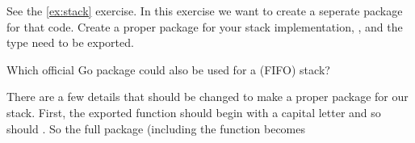 \begin{Exercise}[title={Stack as package},difficulty=2]
\label{ex:stack-package}
See the \ref{ex:stack} exercise. In this exercise we want to create
a seperate package for that code.
\Question\label{ex:stack-package q1} Create a proper package for your
stack implementation, ,  and the  type need to be
exported.

\Question\label{ex:stack-package q2} Which official Go package could
also be used for a (FIFO) stack?

\end{Exercise}

\begin{Answer}
\Question There are a few details that should be changed to make a proper package
for our stack. First, the exported function should begin with a capital 
letter and so should . So the full package (including the
 function becomes


\end{Answer}
